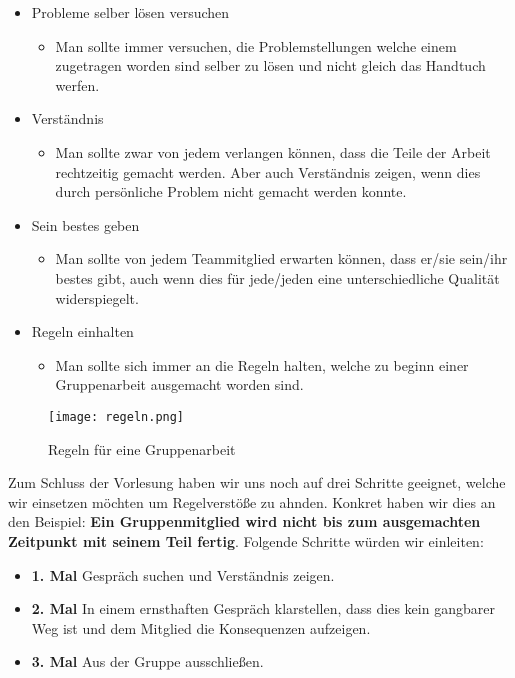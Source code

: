 \documentclass[12pt]{article}
\begin{document}
\begin{itemize}
\begin{itemize}
 \end{itemize}
 \item Probleme selber lösen versuchen
 \begin{itemize}
  \item [] Man sollte immer versuchen, die Problemstellungen welche einem zugetragen worden sind selber zu lösen und nicht gleich das Handtuch werfen.
 \end{itemize}
 \item Verständnis
 \begin{itemize}
  \item [] Man sollte zwar von jedem verlangen können, dass die Teile der Arbeit rechtzeitig gemacht werden. Aber auch Verständnis zeigen, wenn dies durch persönliche Problem nicht gemacht werden konnte.
 \end{itemize}
 \item Sein bestes geben
 \begin{itemize}
  \item [] Man sollte von jedem Teammitglied erwarten können, dass er/sie sein/ihr bestes gibt, auch wenn dies für jede/jeden eine unterschiedliche Qualität widerspiegelt.
 \end{itemize}
 \item Regeln einhalten
 \begin{itemize}
  \item [] Man sollte sich immer an die Regeln halten, welche zu beginn einer Gruppenarbeit ausgemacht worden sind.
 \end{itemize}
 \pagebreak
\end{itemize}
\begin{figure}[!ht]
 \begin{center}
  \texttt{[image: regeln.png]}
 \end{center}
 \caption{Regeln für eine Gruppenarbeit}
\end{figure}
\pagebreak
Zum Schluss der Vorlesung haben wir uns noch auf drei Schritte geeignet, welche wir einsetzen möchten um Regelverstöße zu ahnden. Konkret haben wir dies an den Beispiel: \textbf{Ein Gruppenmitglied wird nicht bis zum ausgemachten Zeitpunkt mit seinem Teil fertig}. Folgende Schritte würden wir einleiten:
\begin{itemize}
 \item [] \textbf{1. Mal} Gespräch suchen und Verständnis zeigen.
 \item [] \textbf{2. Mal} In einem ernsthaften Gespräch klarstellen, dass dies kein gangbarer Weg ist und dem Mitglied die Konsequenzen aufzeigen.
 \item [] \textbf{3. Mal} Aus der Gruppe ausschließen.
\end{itemize}
\end{document}
